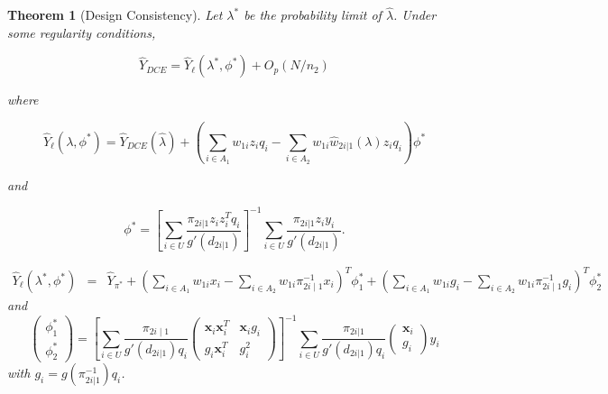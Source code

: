 \documentclass[12pt]{article}
\newtheorem{theorem}{Theorem}
\newcommand{\bx}{\mathbf{x}}
\begin{document}
\begin{theorem}[Design Consistency]\label{thm:dc1}
  Let $\lambda^*$ be the probability limit of $\hat \lambda$.
  Under some regularity conditions,

  $$\hat Y_{DCE} = \hat Y_\ell(\lambda^*, \phi^*) + O_p(N / n_2)$$

  where

  $$\hat Y_{\ell}(\lambda, \phi^*) = \hat Y_{DCE}(\hat \lambda) + 
  \left(\sum_{i \in A_1} w_{1i} z_i q_i - \sum_{i \in A_2} w_{1i} \hat w_{2i|1}(
  \lambda) z_i q_i\right)\phi^*$$

  and

  $$\phi^* = 
  \left[\sum_{i \in U} \frac{\pi_{2i|1}z_i z_i^T q_i}{g'(d_{2i|1})}\right]^{-1}
  \sum_{i \in U} \frac{\pi_{2i|1}z_i y_i}{g'(d_{2i|1})}.$$

   \begin{eqnarray*}
   \hat Y_{\ell}( \lambda^*, \phi^*) &=&   \hat{Y}_{\pi^*} + 
  \left(\sum_{i \in A_1} w_{1i} x_i  -  \sum_{i \in A_2} w_{1i} \pi_{2i \mid
  1}^{-1} x_i  \right)^T \phi_1^* + \left(\sum_{i \in A_1} w_{1i} g_i   -
\sum_{i \in A_2} w_{1i} \pi_{2i \mid 1}^{-1}g_i  \right)^T \phi_2^*  
  \end{eqnarray*} 
  and  $$\begin{pmatrix}
  \phi_1^* \\
  \phi_2^* 
  \end{pmatrix}
  = \left[ \sum_{i \in U} \frac{\pi_{2i \mid 1} }{ g'(d_{2i|1}) q_i} 
  \begin{pmatrix}
  \bx_i \bx_i^T &   \bx_i g_i   \\
  g_i  \bx_i^T   & g_i^2     \end{pmatrix} \right]^{-1}
  \sum_{i \in U} \frac{\pi_{2i|1}}{ g'(d_{2i | 1}) q_i} \begin{pmatrix}
    \bx_i \\ g_i 
  \end{pmatrix}y_i $$
with $g_i = g( \pi_{2i |1}^{-1}) q_i$.
\end{theorem}
\end{document}
